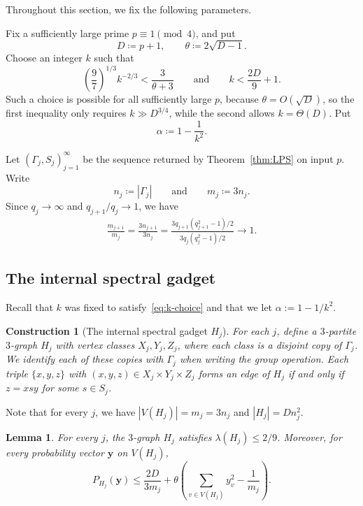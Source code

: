 \documentclass[10pt]{article}
\numberwithin{equation}{section}
\newtheorem{lemma}[theorem]{Lemma}
\newtheorem{construction}[theorem]{Construction}
\begin{document}
Throughout this section, we fix the following parameters.

Fix a sufficiently large prime $p\equiv 1\pmod 4$, and put
\[
        D\coloneqq p+1,\qquad \theta\coloneqq 2\sqrt{D-1}.
\]
Choose an integer $k$ such that
\begin{equation}
        \left(\frac97\right)^{1/3}k^{-2/3}<\frac3{\theta+3} \qquad\text{and}\qquad k<\frac{2D}{9}+1 .
        \label{eq:k-choice}
\end{equation}
Such a choice is possible for all sufficiently large $p$, because $\theta=O(\sqrt D)$, so the first inequality only requires $k\gg D^{3/4}$, while the second allows $k=\Theta(D)$.
Put
\[
        \alpha\coloneqq 1-\frac1{k^2}.
\]

Let $(\Gamma_j,S_j)_{j=1}^\infty$ be the sequence returned by Theorem~\ref{thm:LPS} on input $p$. Write
\[
        n_j\coloneqq |\Gamma_j|\qquad\text{and}\qquad m_j\coloneqq 3n_j .
\]
Since $q_j\to\infty$ and $q_{j+1}/q_j\to 1$, we have
\begin{align*}
    \frac{m_{j+1}}{m_j}
    = \frac{3n_{j+1}}{3n_{j}}
    = \frac{3q_{j+1}(q_{j+1}^{2}-1)/2}{3q_j(q_j^2-1)/2}
    \to 1. 
\end{align*}

\subsection{The internal spectral gadget}
%
Recall that $k$ was fixed to satisfy~\eqref{eq:k-choice} and that we let $\alpha:=1-1/k^2$.

\begin{construction}[The internal spectral gadget $H_j$]\label{con:spectral-gadget}
    For each $j$, define a $3$-partite $3$-graph $H_j$ with vertex classes $X_j,Y_j,Z_j$, where each class is a disjoint copy of $\Gamma_j$. We identify each of these copies with $\Gamma_j$ when writing the group operation. 
    Each triple $\{x,y,z\}$ with $(x,y,z) \in X_j\times Y_j \times Z_j$ forms an edge of $H_j$ if and only if $z=xsy$ for some $s \in S_j$. 
\end{construction}

Note that for every $j$, we have $|V(H_j)|=m_j=3n_j$ and $|H_j|=Dn_j^2$.

\begin{lemma}\label{lem:centered}
For every $j$, the $3$-graph $H_j$ satisfies $\lambda(H_j)\le 2/9$. Moreover, for every probability vector $\mathbf{y}$ on $V(H_j)$,
\[
        P_{H_j}(\mathbf{y})\le \frac{2D}{3m_j} +\theta\left(\sum_{v\in V(H_j)}y_v^2-\frac1{m_j}\right).
\]
\end{lemma}
\end{document}
